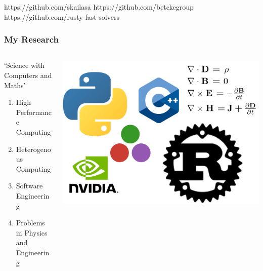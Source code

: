 \begin{frame}
\begin{columns}
\begin{column}{0.5\textwidth}
\begin{center}
\begin{minipage}{0.48\linewidth}
                    \centering
                \end{minipage}%
            \end{center}
        \end{column}
    \end{columns}
    https://github.com/skailasa
    https://github.com/betckegroup
    https://github.com/rusty-fast-solvers
\end{frame}

\begin{frame}
    \frametitle{My Research}
    \begin{columns}
        \begin{column}{0.5\textwidth}
            `Science with Computers and Maths'
           \begin{enumerate}
               \item High Performance Computing
               \item Heterogenous Computing
               \item Software Engineering
               \item Problems in Physics and Engineering
           \end{enumerate}
        \end{column}
        \begin{column}{0.5\textwidth}
            \begin{center}
                \begin{minipage}{0.48\textwidth}
                    \includegraphics[width=1.6\linewidth]{assets/collage.png}
                \end{minipage}
            \end{center}
        \end{column}
    \end{columns}
\end{frame}
